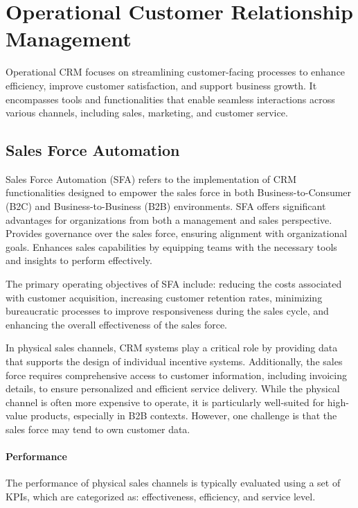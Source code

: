 \section{Operational Customer Relationship Management}

Operational CRM focuses on streamlining customer-facing processes to enhance efficiency, improve customer satisfaction, and support business growth. 
It encompasses tools and functionalities that enable seamless interactions across various channels, including sales, marketing, and customer service.

\subsection{Sales Force Automation}
Sales Force Automation (SFA) refers to the implementation of CRM functionalities designed to empower the sales force in both Business-to-Consumer (B2C) and Business-to-Business (B2B) environments.
SFA offers significant advantages for organizations from both a management and sales perspective. 
Provides governance over the sales force, ensuring alignment with organizational goals.
Enhances sales capabilities by equipping teams with the necessary tools and insights to perform effectively.

The primary operating objectives of SFA include: reducing the costs associated with customer acquisition, increasing customer retention rates, minimizing bureaucratic processes to improve responsiveness during the sales cycle, and enhancing the overall effectiveness of the sales force.

In physical sales channels, CRM systems play a critical role by providing data that supports the design of individual incentive systems. 
Additionally, the sales force requires comprehensive access to customer information, including invoicing details, to ensure personalized and efficient service delivery.
While the physical channel is often more expensive to operate, it is particularly well-suited for high-value products, especially in B2B contexts. 
However, one challenge is that the sales force may tend to own customer data.

\paragraph*{Performance}
The performance of physical sales channels is typically evaluated using a set of KPIs, which are categorized as: effectiveness, efficiency, and service level. 

